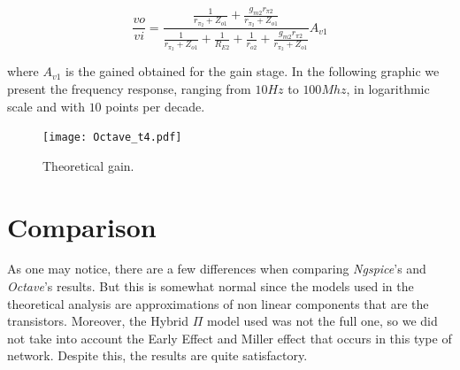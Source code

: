 \begin{equation}
    \frac{v{o}}{v{i}}=\frac{\frac{1}{r_{\pi_{2}}+Z_{o1}}+\frac{g_{m2}r_{\pi2}}{r_{\pi_{2}}+Z_{o1}}}{\frac{1}{r_{\pi_{2}}+Z_{o1}}+\frac{1}{R_{E2}}+\frac{1}{r_{o2}}+\frac{g_{m2}r_{\pi2}}{r_{\pi_{2}}+Z_{o1}}}A_{v1}
\end{equation}

where $A_{v1}$ is the gained obtained for the gain stage.
 In the following graphic we present the frequency response, ranging from $10 Hz$ to $100 Mhz$, in logarithmic scale and with $10$ points per decade.

 \begin{figure}[H] \centering
    \texttt{[image: Octave\_t4.pdf]}
    \caption{Theoretical gain.}
    \label{fig:Octave_t4}
\end{figure}

\section{Comparison}

As one may notice, there are a few differences when comparing \textit{Ngspice}'s and \textit{Octave}'s results.
But this is somewhat normal since the models used in the theoretical analysis are approximations of non linear components that are the transistors.
Moreover, the Hybrid $\Pi$ model used was not the full one, so we did not take into account the Early Effect and Miller effect
that occurs in this type of network. Despite this, the results are quite satisfactory.